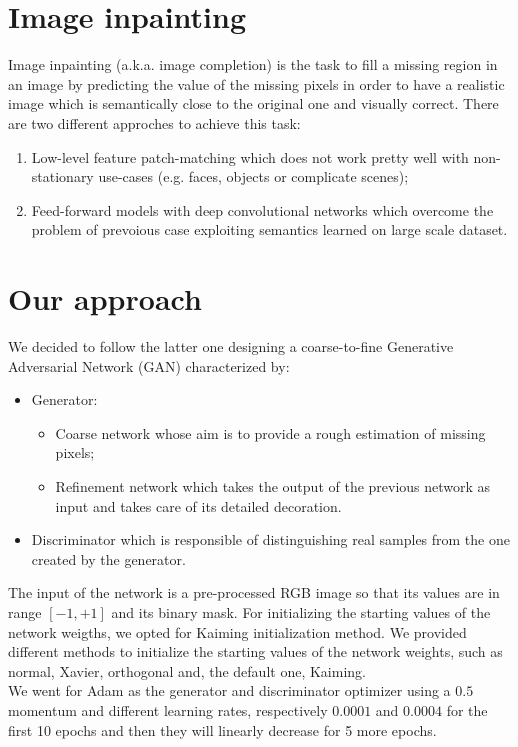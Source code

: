 \documentclass[10pt,twocolumn,letterpaper]{article}
\begin{document}
\section{Image inpainting}
Image inpainting (a.k.a. image completion) is the task to fill a missing region
in an image by predicting the value of the missing pixels in order to have a
realistic image which is semantically close to the original one and visually
correct. There are two different approches to achieve this task:
\begin{enumerate}
  \item Low-level feature patch-matching which does not work pretty well with
    non-stationary use-cases (e.g. faces, objects or complicate scenes);
  \item	Feed-forward models with deep convolutional networks which overcome the
    problem of prevoious case exploiting semantics learned on large scale
    dataset.
\end{enumerate}
\section{Our approach}
We decided to follow the latter one designing a coarse-to-fine Generative
Adversarial Network (GAN) characterized by:
\begin{itemize}
	\item
	Generator:
	\begin{itemize}
    \item Coarse network whose aim is to provide a rough estimation of missing
      pixels;
    \item Refinement network which takes the output of the previous network as
      input and takes care of its detailed decoration.
	\end{itemize}
  \item	Discriminator which is responsible of distinguishing real samples from
    the one created by the generator.
\end{itemize}
The input of the network is a pre-processed RGB image so that its values are in
range \([-1,+1]\) and its binary mask. For initializing the starting values of
the network weigths, we opted for Kaiming initialization method. We provided
different methods to initialize the starting values of the network weights, such
as normal, Xavier, orthogonal and, the default one, Kaiming.\\

We went for Adam as the generator and discriminator optimizer using a \(0.5\)
momentum and different learning rates, respectively \(0.0001\) and \(0.0004\)
for the first 10 epochs and then they will linearly decrease for 5 more epochs.
\end{document}

